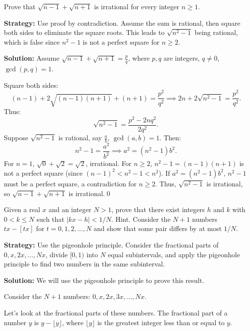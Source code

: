 \begin{problembox}
Prove that $\sqrt{n - 1} + \sqrt{n + 1}$ is irrational for every integer $n \geq 1$.
\end{problembox}

\noindent\textbf{Strategy:} Use proof by contradiction. Assume the sum is rational, then square both sides to eliminate the square roots. This leads to $\sqrt{n^2 - 1}$ being rational, which is false since $n^2 - 1$ is not a perfect square for $n \geq 2$.

\bigskip\noindent\textbf{Solution:}
Assume $\sqrt{n - 1} + \sqrt{n + 1} = \frac{p}{q}$, where $p, q$ are integers, $q \neq 0$, $\gcd(p, q) = 1$.

Square both sides:
\[
(n - 1) + 2\sqrt{(n - 1)(n + 1)} + (n + 1) = \frac{p^2}{q^2} \implies 2n + 2\sqrt{n^2 - 1} = \frac{p^2}{q^2}.
\]
Thus:
\[
\sqrt{n^2 - 1} = \frac{p^2 - 2n q^2}{2 q^2}.
\]
Suppose $\sqrt{n^2 - 1}$ is rational, say $\frac{a}{b}$, $\gcd(a, b) = 1$. Then:
\[
n^2 - 1 = \frac{a^2}{b^2} \implies a^2 = (n^2 - 1)b^2.
\]
For $n = 1$, $\sqrt{0} + \sqrt{2} = \sqrt{2}$, irrational. For $n \geq 2$, $n^2 - 1 = (n - 1)(n + 1)$ is not a perfect square (since $(n - 1)^2 < n^2 - 1 < n^2$). If $a^2 = (n^2 - 1)b^2$, $n^2 - 1$ must be a perfect square, a contradiction for $n \geq 2$. Thus, $\sqrt{n^2 - 1}$ is irrational, so $\sqrt{n - 1} + \sqrt{n + 1}$ is irrational.\qed


\begin{problembox}
Given a real $x$ and an integer $N > 1$, prove that there exist integers $h$ and $k$ with $0 < k \leq N$ such that $|kx - h| < 1/N$. Hint. Consider the $N+1$ numbers $tx-[tx]$ for $t=0,1,2,\dots,N$ and show that some pair differs by at most $1/N$.
\end{problembox}

\noindent\textbf{Strategy:} Use the pigeonhole principle. Consider the fractional parts of $0, x, 2x, \ldots, Nx$, divide $[0,1)$ into $N$ equal subintervals, and apply the pigeonhole principle to find two numbers in the same subinterval.

\bigskip\noindent\textbf{Solution:}
We will use the pigeonhole principle to prove this result.

Consider the $N + 1$ numbers: $0, x, 2x, 3x, \ldots, Nx$.

Let's look at the fractional parts of these numbers. The fractional part of a number $y$ is $y - \lfloor y \rfloor$, where $\lfloor y \rfloor$ is the greatest integer less than or equal to $y$.

